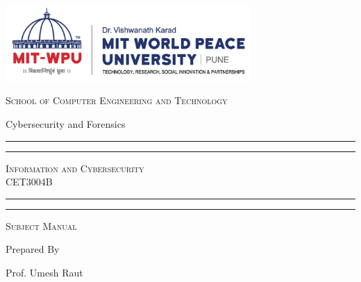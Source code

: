 \documentclass[openany]{book}
\begin{document}
\begin{titlepage}
	\centering



	\includegraphics[width=0.7\textwidth]{Final-MIT-WPU-logo-page-001.jpg}\par\vspace{1cm}
	\huge\textsc{
		School of Computer Engineering and Technology
	}\\

	\vspace{0.75\baselineskip} %

	\LARGE{
		Cybersecurity and Forensics
	}

	\vfill %


	\rule{\textwidth}{1.6pt}\vspace*{-\baselineskip}\vspace*{2pt}
	\rule{\textwidth}{0.6pt}
	\vspace{0.75\baselineskip} %



	\huge{\textsc{
			Information and Cybersecurity\\
			CET3004B
		}} \\



	\vspace{0.5\baselineskip} %
	\rule{\textwidth}{0.6pt}\vspace*{-\baselineskip}\vspace*{2.8pt}
	\rule{\textwidth}{1.6pt}

	\vspace{1\baselineskip} %


	\LARGE\textsc{
		Subject Manual
	} %
	\vfill


	Prepared By
	\vspace{0.5\baselineskip} %

	\Large{
		Prof. Umesh Raut \\
	}


	\vspace{0.5\baselineskip} %

\end{titlepage}
\end{document}
